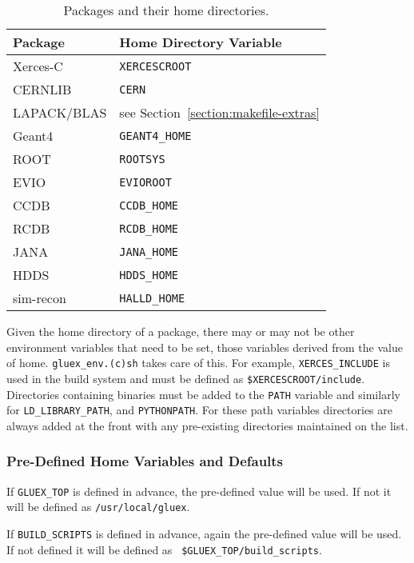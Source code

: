 \documentclass[12pt]{article}
\begin{document}
\begin{table}
\begin{center}
\begin{tabular}{|l|l|}
\hline
\bf Package & \bf Home Directory Variable \\
\hline Xerces-C & {\tt XERCESCROOT} \\
CERNLIB & {\tt CERN} \\
LAPACK/BLAS & see Section~\ref{section:makefile-extras} \\
Geant4 & {\tt GEANT4\_HOME} \\
ROOT & {\tt ROOTSYS} \\
EVIO & {\tt EVIOROOT} \\
CCDB & {\tt CCDB\_HOME} \\
RCDB & {\tt RCDB\_HOME} \\
JANA & {\tt JANA\_HOME} \\
HDDS & {\tt HDDS\_HOME} \\
sim-recon & {\tt HALLD\_HOME} \\
\hline
\end{tabular}
\end{center}
\caption{Packages and their home directories.}\label{table:home-directories}
\end{table}

Given the home directory of a package, there may or may not be other
environment variables that need to be set, those variables derived
from the value of home. {\tt gluex\_env.(c)sh} takes care of this. For
example, {\tt XERCES\_INCLUDE} is used in the build system and must be
defined as {\tt \$XERCESCROOT/include}. Directories containing
binaries must be added to the {\tt PATH} variable and similarly for
{\tt LD\_LIBRARY\_PATH}, and {\tt PYTHONPATH}. For these path
variables directories are always added at the front with any
pre-existing directories maintained on the list.

\subsubsection{Pre-Defined Home Variables and Defaults}

If {\tt GLUEX\_TOP} is defined in advance, the pre-defined value will
be used. If not it will be defined as {\tt /usr/local/gluex}.

If {\tt BUILD\_SCRIPTS} is defined in advance, again the pre-defined
value will be used. If not defined it will be defined as {\tt
  \$GLUEX\_TOP/build\_scripts}.
\end{document}
